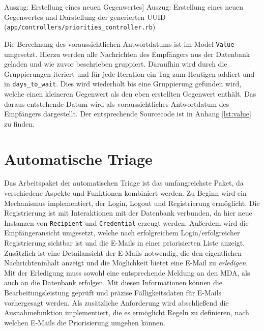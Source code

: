 \begin{listing}[!ht]
\inputminted[firstline=14, lastline=23,linenos]{ruby}{Listings/Pkg2/priorities_controller.rb}

\caption
    [Auszug: Erstellung eines neuen Gegenwertes]
    {Auszug: Erstellung eines neuen Gegenwertes und Darstellung der generierten UUID (\texttt{app/controllers/priorities\_controller.rb})}

\label{lst:priorities_controller}
\end{listing}

\noindent Die Berechnung des voraussichtlichen Antwortdatums ist im Model \texttt{Value} umgesetzt. Hierzu werden alle Nachrichten des Empfängers aus der Datenbank geladen und wie zuvor beschrieben gruppiert. Daraufhin wird durch die Gruppierungen iteriert und für jede Iteration ein Tag zum Heutigen addiert und in \texttt{days\_to\_wait}. Dies wird wiederholt bis eine Gruppierung gefunden wird, welche einen kleineren Gegenwert als den eben erstellten Gegenwert enthält. Das daraus entstehende Datum wird als voraussichtliches Antwortdatum des Empfängers dargestellt. Der entsprechende Sourcecode ist in Anhang \ref{lst:value} zu finden.


\section{Automatische Triage}
\label{Automatische_Triage}

Das Arbeitspaket der automatischen Triage ist das umfangreichste Paket, da verschiedene Aspekte und Funktionen kombiniert werden. Zu Beginn wird ein Mechanismus implementiert, der Login, Logout und Registrierung ermöglicht. Die Registrierung ist mit Interaktionen mit der Datenbank verbunden, da hier neue Instanzen von \texttt{Recipient} und \texttt{Credential} erzeugt werden. Außerdem wird die Empfängeransicht umgesetzt, welche nach erfolgreichem Login/erfolgreicher Registrierung sichtbar ist und die E-Mails in einer priorisierten Liste anzeigt. Zusätzlich ist eine Detailansicht der E-Mails notwendig, die den eigentlichen Nachrichteninhalt anzeigt und die Möglichkeit bietet eine E-Mail zu \textit{erledigen}. Mit der Erledigung muss sowohl eine entsprechende Meldung an den MDA, als auch an die Datenbank erfolgen. Mit diesen Informationen können die Bearbeitungsleistung geprüft und präzise Fälligkeitsdaten für E-Mails vorhergesagt werden. Als zusätzliche Anforderung wird abschließend die Ausnahmefunktion implementiert, die es ermöglicht Regeln zu definieren, nach welchen E-Mails die Priorisierung umgehen können.


